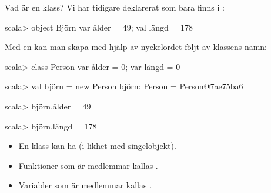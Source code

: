 
\ifkompendium\else


\begin{Slide}{Vad är en klass?}\SlideFontSmall
Vi har tidigare deklarerat  som bara finns i  :
\begin{REPLnonum}
scala> object Björn { var ålder = 49; val längd = 178 }
\end{REPLnonum}

Med en  kan man skapa   med hjälp av nyckelordet  följt av klassens namn:

\begin{REPLnonum}
scala> class Person { var ålder = 0; var längd = 0 }

scala> val björn = new Person
björn: Person = Person@7ae75ba6

scala> björn.ålder = 49

scala> björn.längd = 178
\end{REPLnonum}

\begin{itemize}

\item En klass kan ha  (i likhet med singelobjekt). 

\item Funktioner som är medlemmar kallas .

\item Variabler som är medlemmar kallas .


\end{itemize}

\end{Slide}


